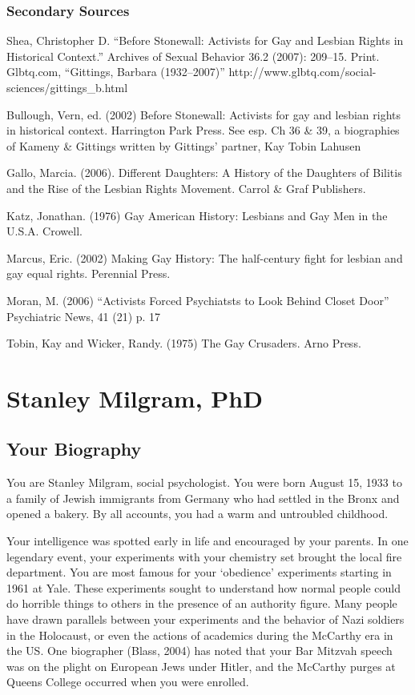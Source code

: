 \subsection{Secondary Sources}
\label{secondarysources}

Shea, Christopher D. ``Before Stonewall: Activists for Gay and Lesbian Rights in Historical Context.'' Archives of Sexual Behavior 36.2 (2007): 209--15. Print.
Glbtq.com, ``Gittings, Barbara (1932--2007)'' http:\slash \slash www.glbtq.com\slash social-sciences\slash gittings\_b.html

Bullough, Vern, ed. (2002) Before Stonewall: Activists for gay and lesbian rights in historical context. Harrington Park Press. See esp. Ch 36 \& 39, a biographies of Kameny \& Gittings written by Gittings' partner, Kay Tobin Lahusen

Gallo, Marcia. (2006). Different Daughters: A History of the Daughters of Bilitis and the Rise of the Lesbian Rights Movement. Carrol \& Graf Publishers.

Katz, Jonathan. (1976) Gay American History: Lesbians and Gay Men in the U.S.A. Crowell.

Marcus, Eric. (2002) Making Gay History: The half-century fight for lesbian and gay equal rights. Perennial Press.

Moran, M. (2006) ``Activists Forced Psychiatsts to Look Behind Closet Door'' Psychiatric News, 41 (21) p. 17

Tobin, Kay and Wicker, Randy. (1975) The Gay Crusaders. Arno Press.

\chapter{Stanley Milgram, PhD}
\label{stanleymilgramphd}

\section{Your Biography}
\label{yourbiography}

You are Stanley Milgram, social psychologist. You were born August 15, 1933 to a family of Jewish immigrants from Germany who had settled in the Bronx and opened a bakery. By all accounts, you had a warm and untroubled childhood.

Your intelligence was spotted early in life and encouraged by your parents. In one legendary event, your experiments with your chemistry set brought the local fire department. You are most famous for your `obedience' experiments starting in 1961 at Yale. These experiments sought to understand how normal people could do horrible things to others in the presence of an authority figure. Many people have drawn parallels between your experiments and the behavior of Nazi soldiers in the Holocaust, or even the actions of academics during the McCarthy era in the US. One biographer (Blass, 2004) has noted that your Bar Mitzvah speech was on the plight on European Jews under Hitler, and the McCarthy purges at Queens College occurred when you were enrolled.

